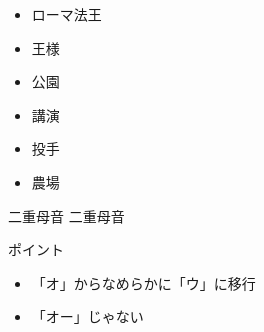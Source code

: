 \documentclass[aspectratio=169, xcolor={dvipsnames,table}]{beamer}
\begin{document}
\begin{frame}[plain]
  \begin{itemize}[<+->]
    \item ローマ法王
    \item 王様
    \item 公園
    \item 講演
    \item 投手
    \item 農場
  \end{itemize}
\end{frame}
\begin{frame}[plain]{二重母音 }
  {\Large 二重母音} {\Huge {}}

  \normalsize ポイント

  \begin{itemize}
    [circle]

    \item \<「オ」からなめらかに「ウ」に移行

    \item \<「オー」じゃない
  \end{itemize}

\end{frame}
\end{document}
